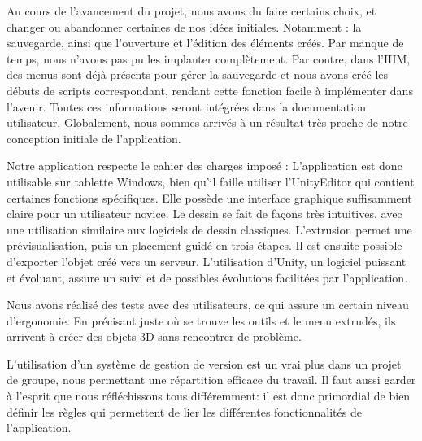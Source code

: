 \documentclass[a4paper,11pt]{article}
\begin{document}
		Au cours de l'avancement du projet, nous avons du faire certains choix, et changer ou abandonner certaines de nos idées initiales. Notamment : la sauvegarde, ainsi que l'ouverture et l'édition des éléments créés.
		Par manque de temps, nous n'avons pas pu les implanter complètement. Par contre, dans l'IHM, des menus sont déjà présents pour gérer la sauvegarde et nous avons créé les débuts de scripts correspondant, rendant cette fonction facile à implémenter dans l'avenir. Toutes ces informations seront intégrées dans la documentation utilisateur.
		Globalement, nous sommes arrivés à un résultat très proche de notre conception initiale de l'application.
		
		Notre application respecte le cahier des charges imposé :
		L'application est donc utilisable sur tablette Windows, bien qu'il faille utiliser l'UnityEditor qui contient certaines fonctions spécifiques. Elle possède une interface graphique suffisamment claire pour un utilisateur novice. Le dessin se fait de façons très intuitives, avec une utilisation similaire aux logiciels de dessin classiques. L'extrusion permet une prévisualisation, puis un placement guidé en trois étapes. Il est ensuite possible d'exporter l'objet créé vers un serveur. L'utilisation d'Unity, un logiciel puissant et évoluant, assure un suivi et de possibles évolutions facilitées par l'application.
		
		Nous avons réalisé des tests avec des utilisateurs, ce qui assure un certain niveau d'ergonomie. En précisant juste où se trouve les outils et le menu extrudés, ils arrivent à créer des objets 3D sans rencontrer de problème.
		
		L'utilisation d'un système de gestion de version est un vrai plus dans un projet de groupe, nous permettant une répartition efficace du travail. Il faut aussi garder à l'esprit que nous réfléchissons tous différemment: il est donc primordial de bien définir les règles qui permettent de lier les différentes fonctionnalités de l'application.
		
\end{document}

